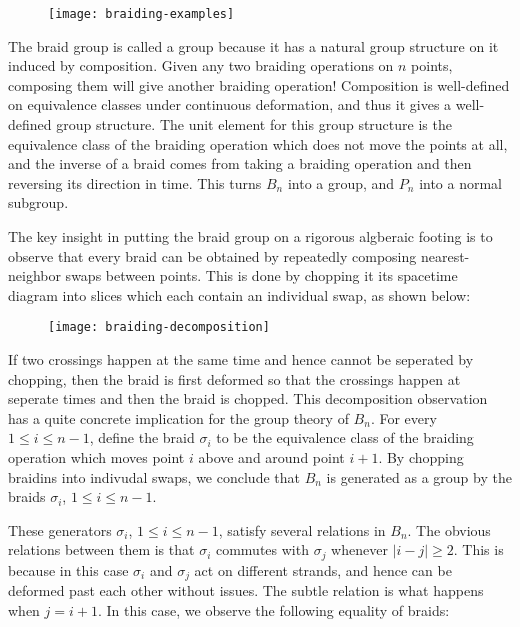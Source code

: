 \begin{figure}
\begin{center}
\texttt{[image: braiding-examples]}
\label{braiding-examples}
\end{center}
\end{figure}

The braid group is called a group because it has a natural group structure on it induced by composition. Given any two braiding operations on $n$ points, composing them will give another braiding operation!  Composition is well-defined on equivalence classes under continuous deformation, and thus it gives a well-defined group structure. The unit element for this group structure is the equivalence class of the braiding operation which does not move the points at all, and the inverse of a braid comes from taking a braiding operation and then reversing its direction in time. This turns $B_n$ into a group, and $P_n$ into a normal subgroup.

The key insight in putting the braid group on a rigorous algberaic footing is to observe that every braid can be obtained by repeatedly composing nearest-neighbor swaps between points. This is done by chopping it its spacetime diagram into slices which each contain an individual swap, as shown below:

\begin{figure}[h]
\begin{center}
\texttt{[image: braiding-decomposition]}
\label{braiding-decomposition}
\end{center}
\end{figure}


If two crossings happen at the same time and hence cannot be seperated by chopping, then the braid is first deformed so that the crossings happen at seperate times and then the braid is chopped. This decomposition observation has a quite concrete implication for the group theory of $B_n$. For every $1\leq i\leq n-1$, define the braid $\sigma_{i}$ to be the equivalence class of the braiding operation which moves point $i$ above and around point $i+1$. By chopping braidins into indivudal swaps, we conclude that $B_n$ is generated as a group by the braids $\sigma_i$, $1\leq i\leq n-1$.

These generators $\sigma_i$, $1\leq i\leq n-1$, satisfy several relations in $B_n$. The obvious relations between them is that $\sigma_i$ commutes with $\sigma_j$ whenever $|i-j|\geq 2$. This is because in this case $\sigma_i$ and $\sigma_j$ act on different strands, and hence can be deformed past each other without issues. The subtle relation is what happens when $j=i+1$. In this case, we observe the following equality of braids:

